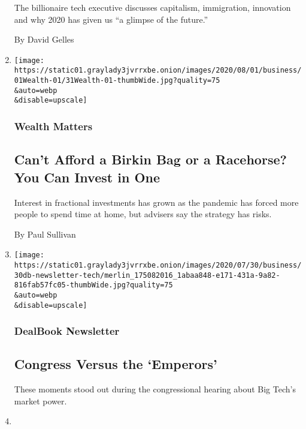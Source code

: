 \begin{enumerate}
  The billionaire tech executive discusses capitalism, immigration,
  innovation and why 2020 has given us ``a glimpse of the future.''

  By David Gelles
\item
  \href{/2020/07/31/your-money/birkin-bag-racehorse-invest.html}{}

  \texttt{[image: https://static01.graylady3jvrrxbe.onion/images/2020/08/01/business/01Wealth-01/31Wealth-01-thumbWide.jpg?quality=75\\\&auto=webp\\\&disable=upscale]}

  \hypertarget{wealth-matters}{%
  \subsubsection{Wealth Matters}\label{wealth-matters}}

  \hypertarget{cant-afford-a-birkin-bag-or-a-racehorse-you-can-invest-in-one}{%
  \subsection{Can't Afford a Birkin Bag or a Racehorse? You Can Invest
  in
  One}\label{cant-afford-a-birkin-bag-or-a-racehorse-you-can-invest-in-one}}

  Interest in fractional investments has grown as the pandemic has
  forced more people to spend time at home, but advisers say the
  strategy has risks.

  By Paul Sullivan
\item
  \href{/2020/07/30/business/dealbook/tech-hearing-highlights.html}{}

  \texttt{[image: https://static01.graylady3jvrrxbe.onion/images/2020/07/30/business/30db-newsletter-tech/merlin\_175082016\_1abaa848-e171-431a-9a82-816fab57fc05-thumbWide.jpg?quality=75\\\&auto=webp\\\&disable=upscale]}

  \hypertarget{dealbook-newsletter-2}{%
  \subsubsection{DealBook Newsletter}\label{dealbook-newsletter-2}}

  \hypertarget{congress-versus-the-emperors}{%
  \subsection{Congress Versus the
  `Emperors'}\label{congress-versus-the-emperors}}

  These moments stood out during the congressional hearing about Big
  Tech's market power.
\item
  \href{/2020/07/30/technology/europe-new-phase-tech-amazon-apple-facebook-google.html}{}


\end{enumerate}

